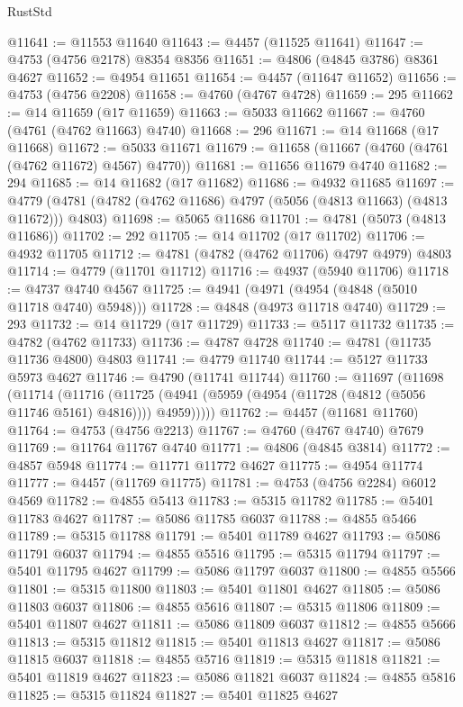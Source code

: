 \begin{lexlean}{RustStd}
\begin{coremodule}
@11641 := @11553 @11640
@11643 := @4457 (@11525 @11641)
@11647 := @4753 (@4756 @2178) @8354 @8356
@11651 := @4806 (@4845 @3786) @8361 @4627
@11652 := @4954 @11651
@11654 := @4457 (@11647 @11652)
@11656 := @4753 (@4756 @2208)
@11658 := @4760 (@4767 @4728)
@11659 := 295
@11662 := @14 @11659 (@17 @11659)
@11663 := @5033 @11662
@11667 := @4760 (@4761 (@4762 @11663) @4740)
@11668 := 296
@11671 := @14 @11668 (@17 @11668)
@11672 := @5033 @11671
@11679 := @11658 (@11667 (@4760 (@4761 (@4762 @11672) @4567) @4770))
@11681 := @11656 @11679 @4740
@11682 := 294
@11685 := @14 @11682 (@17 @11682)
@11686 := @4932 @11685
@11697 := @4779 (@4781 (@4782 (@4762 @11686) @4797 (@5056 (@4813 @11663) (@4813 @11672))) @4803)
@11698 := @5065 @11686
@11701 := @4781 (@5073 (@4813 @11686))
@11702 := 292
@11705 := @14 @11702 (@17 @11702)
@11706 := @4932 @11705
@11712 := @4781 (@4782 (@4762 @11706) @4797 @4979) @4803
@11714 := @4779 (@11701 @11712)
@11716 := @4937 (@5940 @11706)
@11718 := @4737 @4740 @4567
@11725 := @4941 (@4971 (@4954 (@4848 (@5010 @11718 @4740) @5948)))
@11728 := @4848 (@4973 @11718 @4740)
@11729 := 293
@11732 := @14 @11729 (@17 @11729)
@11733 := @5117 @11732
@11735 := @4782 (@4762 @11733)
@11736 := @4787 @4728
@11740 := @4781 (@11735 @11736 @4800) @4803
@11741 := @4779 @11740
@11744 := @5127 @11733 @5973 @4627
@11746 := @4790 (@11741 @11744)
@11760 := @11697
    (@11698
      (@11714
        (@11716
          (@11725 (@4941 (@5959 (@4954 (@11728 (@4812 (@5056 @11746 @5161) @4816)))) @4959)))))
@11762 := @4457 (@11681 @11760)
@11764 := @4753 (@4756 @2213)
@11767 := @4760 (@4767 @4740) @7679
@11769 := @11764 @11767 @4740
@11771 := @4806 (@4845 @3814)
@11772 := @4857 @5948
@11774 := @11771 @11772 @4627
@11775 := @4954 @11774
@11777 := @4457 (@11769 @11775)
@11781 := @4753 (@4756 @2284) @6012 @4569
@11782 := @4855 @5413
@11783 := @5315 @11782
@11785 := @5401 @11783 @4627
@11787 := @5086 @11785 @6037
@11788 := @4855 @5466
@11789 := @5315 @11788
@11791 := @5401 @11789 @4627
@11793 := @5086 @11791 @6037
@11794 := @4855 @5516
@11795 := @5315 @11794
@11797 := @5401 @11795 @4627
@11799 := @5086 @11797 @6037
@11800 := @4855 @5566
@11801 := @5315 @11800
@11803 := @5401 @11801 @4627
@11805 := @5086 @11803 @6037
@11806 := @4855 @5616
@11807 := @5315 @11806
@11809 := @5401 @11807 @4627
@11811 := @5086 @11809 @6037
@11812 := @4855 @5666
@11813 := @5315 @11812
@11815 := @5401 @11813 @4627
@11817 := @5086 @11815 @6037
@11818 := @4855 @5716
@11819 := @5315 @11818
@11821 := @5401 @11819 @4627
@11823 := @5086 @11821 @6037
@11824 := @4855 @5816
@11825 := @5315 @11824
@11827 := @5401 @11825 @4627

\end{coremodule}
\end{lexlean}
